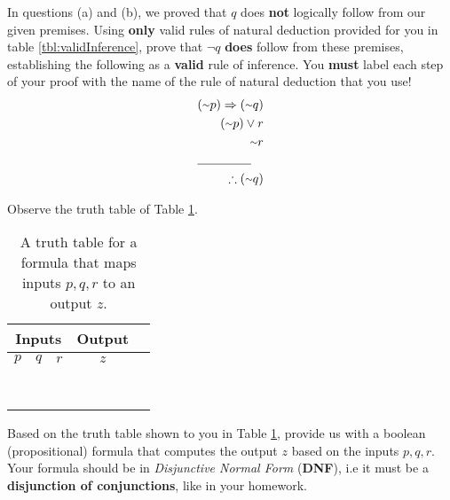 \documentclass[letterpaper,12pt]{article}
\begin{document}
{{ 

{\large In questions (a) and (b), we proved that $q$  does {\bf not} logically follow from our given premises. Using \textbf{only} valid rules of natural deduction provided for you in table \ref{tbl:validInference}, prove that $\neg  q$ {\bf does} follow from these premises, establishing the following as a {\bf valid} rule of inference. } You {\bf must} label each step of your proof with the name of the  rule of natural deduction that you use!
{\large 
\begin{align*} 
		(\neg  p) \Rightarrow (\neg  q) \\ 
		(\neg  p) \lor r \\ 
		\neg  r \\
		\cline{1-2}
		\therefore (\neg  q)
\end{align*} 
} \vspace{-.4in}
\answerspacefullpage


{\large Observe the truth table of Table \ref{tbl:ioTable}. }


\begin{table}[H]
	\centering
	\renewcommand{\arraystretch}{1.2}
{\large
	\begin{tabular}{|c|c|c|c|c|} \hline
		\multicolumn{3}{|c|}{Inputs} & Output \\ \hline 
		$p$ & $q$ & $r$ & $z$ \\ \hline
		\F & \F & \F & \T \\ \hline			
		\F & \F & \T & \F \\ \hline
		\F & \T & \F & \F \\ \hline
		\F & \T & \T & \F \\ \hline
		\T & \F & \F & \T \\ \hline
		\T & \F & \T & \T \\ \hline		
		\T & \T & \F & \F \\ \hline
		\T & \T & \T & \F \\ \hline
	\end{tabular}
	
	}
	\caption{A truth table for a formula that maps inputs $p, q, r$ to an output $z$.}
	\label{tbl:ioTable}
\end{table}


{\large Based on the truth table shown to you in Table \ref{tbl:ioTable}, provide us with a boolean (propositional) formula that computes the output $z$ based on the inputs $p, q, r$. Your formula should be in {\em Disjunctive Normal Form} (\textbf{DNF}), i.e it must be a \textbf{disjunction of conjunctions}, like in your homework.}

}}
\end{document}
